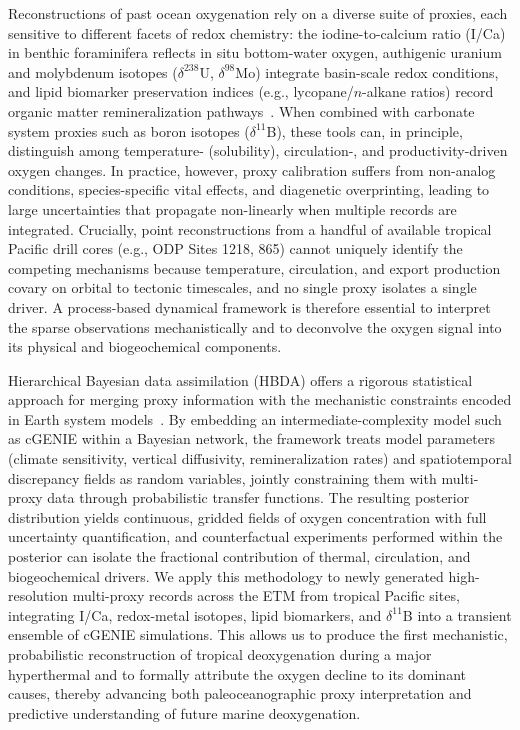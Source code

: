 \documentclass{article}
\begin{document}
Reconstructions of past ocean oxygenation rely on a diverse suite of proxies, each sensitive to different facets of redox chemistry: the iodine-to-calcium ratio (I/Ca) in benthic foraminifera reflects in situ bottom-water oxygen, authigenic uranium and molybdenum isotopes ($\delta^{238}$U, $\delta^{98}$Mo) integrate basin-scale redox conditions, and lipid biomarker preservation indices (e.g., lycopane/$n$-alkane ratios) record organic matter remineralization pathways~\cite{Lu2018,Andersen2020}. When combined with carbonate system proxies such as boron isotopes ($\delta^{11}$B), these tools can, in principle, distinguish among temperature- (solubility), circulation-, and productivity-driven oxygen changes. In practice, however, proxy calibration suffers from non-analog conditions, species-specific vital effects, and diagenetic overprinting, leading to large uncertainties that propagate non-linearly when multiple records are integrated. Crucially, point reconstructions from a handful of available tropical Pacific drill cores (e.g., ODP Sites 1218, 865) cannot uniquely identify the competing mechanisms because temperature, circulation, and export production covary on orbital to tectonic timescales, and no single proxy isolates a single driver. A process-based dynamical framework is therefore essential to interpret the sparse observations mechanistically and to deconvolve the oxygen signal into its physical and biogeochemical components.

Hierarchical Bayesian data assimilation (HBDA) offers a rigorous statistical approach for merging proxy information with the mechanistic constraints encoded in Earth system models~\cite{Tierney2020,Osman2021}. By embedding an intermediate-complexity model such as cGENIE within a Bayesian network, the framework treats model parameters (climate sensitivity, vertical diffusivity, remineralization rates) and spatiotemporal discrepancy fields as random variables, jointly constraining them with multi-proxy data through probabilistic transfer functions. The resulting posterior distribution yields continuous, gridded fields of oxygen concentration with full uncertainty quantification, and counterfactual experiments performed within the posterior can isolate the fractional contribution of thermal, circulation, and biogeochemical drivers. We apply this methodology to newly generated high-resolution multi-proxy records across the ETM from tropical Pacific sites, integrating I/Ca, redox-metal isotopes, lipid biomarkers, and $\delta^{11}$B into a transient ensemble of cGENIE simulations. This allows us to produce the first mechanistic, probabilistic reconstruction of tropical deoxygenation during a major hyperthermal and to formally attribute the oxygen decline to its dominant causes, thereby advancing both paleoceanographic proxy interpretation and predictive understanding of future marine deoxygenation.
\end{document}
